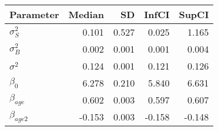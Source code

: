 \begin{table}[ht]
\centering
\begin{tabular}{lrrrr}
  \hline
Parameter & Median & SD & InfCI & SupCI \\ 
  \hline
$\sigma^{2}_{S}$ & 0.101 & 0.527 & 0.025 & 1.165 \\ 
  $\sigma^{2}_{B}$ & 0.002 & 0.001 & 0.001 & 0.004 \\ 
  $\sigma^{2}$ & 0.124 & 0.001 & 0.121 & 0.126 \\ 
  $\beta_{0}$ & 6.278 & 0.210 & 5.840 & 6.631 \\ 
  $\beta_{age}$ & 0.602 & 0.003 & 0.597 & 0.607 \\ 
  $\beta_{age2}$ & -0.153 & 0.003 & -0.158 & -0.148 \\ 
   \hline
\end{tabular}
\end{table}
